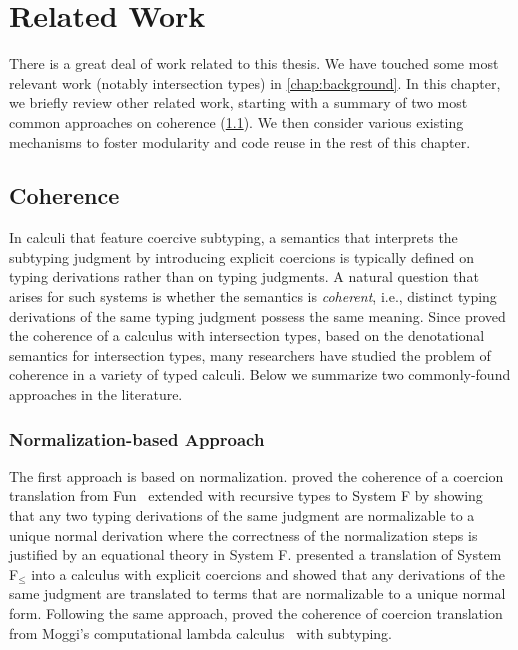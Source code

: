 
\chapter{Related Work}
\label{sec:related}


There is a great deal of work related to this thesis. We have touched some most
relevant work (notably intersection types) in \cref{chap:background}. In this
chapter, we briefly review other related work, starting with a summary of two
most common approaches on coherence (\cref{sec:related:coherence}). We then
consider various existing mechanisms to foster modularity and code reuse in the
rest of this chapter.


\section{Coherence}
\label{sec:related:coherence}

In calculi that feature coercive subtyping, a semantics that interprets the
subtyping judgment by introducing explicit coercions is typically defined on
typing derivations rather than on typing judgments. A natural question that
arises for such systems is whether the semantics is \emph{coherent}, i.e.,
distinct typing derivations of the same typing judgment possess the same
meaning. Since \citet{Reynolds_1991} proved the coherence of a calculus with
intersection types, based on the denotational semantics for intersection types,
many researchers have studied the problem of coherence in a variety of typed
calculi. Below we summarize two commonly-found approaches in the literature.

\subsection{Normalization-based Approach}
The first approach is based on normalization. \citet{Breazu_Tannen_1991} proved
the coherence of a coercion translation from
\textsf{Fun}~\citep{cardelli1985understanding} extended with recursive types to
System F by showing that any two typing derivations of the same judgment are
normalizable to a unique normal derivation where the correctness of the
normalization steps is justified by an equational theory in System F.
\citet{Curien_1992} presented a translation of System F$_\leq$ into a calculus
with explicit coercions and showed that any derivations of the same judgment are
translated to terms that are normalizable to a unique normal form. Following the
same approach, \citet{SCHWINGHAMMER_2008} proved the coherence of coercion
translation from Moggi's computational lambda calculus~\citep{Moggi_1991} with
subtyping.


